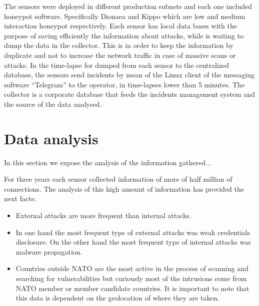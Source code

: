 \documentclass[a4paper]{llncs}
\begin{document}
The sensors were deployed in different production subnets and each one included honeypot software. Specifically Dionaea\cite{dionaea} and Kippo\cite{kippo} which are low and medium interaction honeypot respectively. Each sensor has local data bases with the purpose of saving efficiently the information about attacks, while is waiting to dump the data in the collector. This is  in order to keep the information by duplicate and not to increase the network traffic in case of massive scans or attacks. In the time-lapse for dumped from each sensor to the centralized database, the sensors send incidents by mean of the Linux client of the messaging software ``Telegram'' to the operator, in time-lapses lower than 5 minutes. The collector is a corporate database that feeds the incidents management system and the source of the data analysed.
	
	
\section{Data analysis}
\label{sec:analysis}
In this section we expose the analysis of the information gathered...

For three years each sensor collected information of more of half million of connections. The analysis of this high amount of information has provided the next facts:
\begin{itemize}
	\item External attacks are more frequent than internal attacks.
	\item In one hand the most frequent type of external attacks was weak credentials disclosure. On the other hand the most frequent type of internal attacks was malware propagation.
	\item Countries outside NATO are the most active in the process of scanning and searching for vulnerabilities but curiously most of the intrusions come from NATO member or member candidate countries. It is important to note that this data is dependent on the geolocation of where they are taken.
\end{itemize}
	
\end{document}
